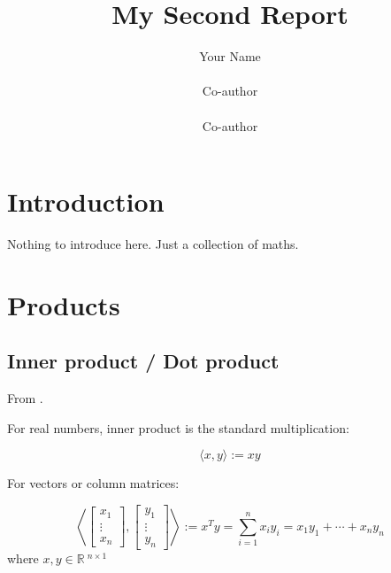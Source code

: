 \documentclass{article}
\title{My Second Report}
\author{Your Name \\ \tit{WHA 160016} \\ \AND
        Co-author \\ \tit{Supervisor} \\ \AND
        Co-author \\ \tit{Co-supervisor}}
\begin{document}
\maketitle




\section{Introduction}
\label{sec: Introduction}

Nothing to introduce here. Just a collection of maths.





\section{Products}
\label{sec: Products}

\subsection{Inner product / Dot product}
\label{subsec: Inner product}

From \cite{wiki2019innerProd,wiki2019dotProd,wiki2019cosineSim}.

For real numbers, inner product is the standard multiplication:

\begin{equation}
    \langle x, y\rangle := x y
\end{equation}

For vectors or column matrices:

\begin{equation}
    \left\langle\left[ \begin{array}{c}{ x_{1}} \\ {\vdots} \\ {x_{n}}\end{array}\right], \left[ \begin{array}{c}{y_{1}} \\ {\vdots} \\ {y_{n}}\end{array}\right]\right\rangle := x^{T} y=\sum_{i=1}^{n} x_{i} y_{i}=x_{1} y_{1}+\cdots+x_{n} y_{n}
\end{equation}
\noindent
where $x, y \in\mathbb{R}\:^{n \times 1}$
\end{document}
